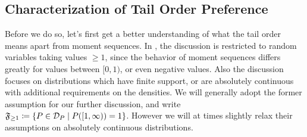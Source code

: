 \documentclass[a4paper]{scrreprt}
\begin{document}
    \subsection{Characterization of Tail Order Preference}
    \newcommand{\Fgeq}{\mathfrak{F}_{\geq 1}} %
    Before we do so, let's first get a better understanding of what the tail order means apart from moment sequences.
    In \cite{bib:rassGameRiskManagI}, the discussion is restricted to random variables taking values $\geq 1$, since the behavior of moment sequences differs greatly for values between $[0, 1)$, or even negative values. Also the discussion focuses on distributions which have finite support, or are absolutely continuous with additional requirements on the densities. We will generally adopt the former assumption for our further discussion, and write $\Fgeq \coloneqq \set{P \in \DP \mid P([1, \infty)) = 1}$.
    However we will at times slightly relax their assumptions on absolutely continuous distributions.
    
\end{document}
